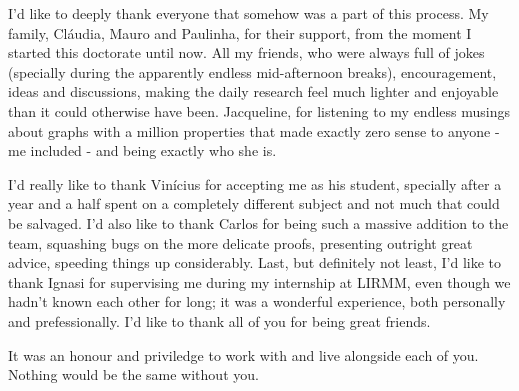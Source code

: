 I'd like to deeply thank everyone that somehow was a part of this process.
My family, Cláudia, Mauro and Paulinha, for their support, from the moment I started this doctorate until now.
All my friends, who were always full of jokes (specially during the apparently endless mid-afternoon breaks), encouragement, ideas and discussions, making the daily research feel much lighter and enjoyable than it could otherwise have been.
Jacqueline, for listening to my endless musings about graphs with a million properties that made exactly zero sense to anyone - me included - and being exactly who she is.

I'd really like to thank Vinícius for accepting me as his student, specially after a year and a half spent on a completely different subject and not much that could be salvaged.
I'd also like to thank Carlos for being such a massive addition to the team, squashing bugs on the more delicate proofs, presenting outright great advice, speeding things up considerably.
Last, but definitely not least, I'd like to thank Ignasi for supervising me during my internship at LIRMM, even though we hadn't known each other for long; it was a wonderful experience, both personally and prefessionally.
I'd like to thank all of you for being great friends.

It was an honour and priviledge to work with and live alongside each of you.
Nothing would be the same without you.
